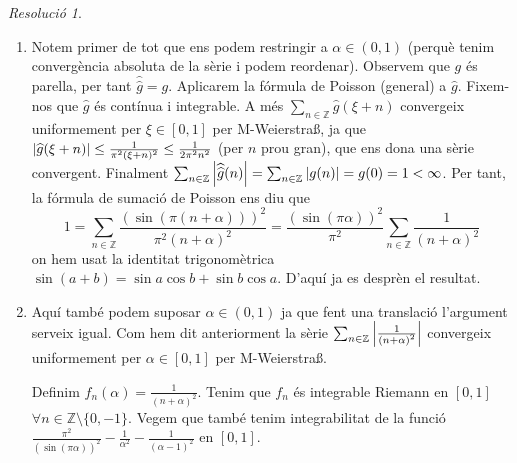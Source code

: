 \documentclass[10pt,a4paper]{article}
\newcommand{\ZZ}{\ensuremath{\mathbb{Z}}} %
\theoremstyle{definition}
\theoremstyle{remark}
\newtheorem*{res}{Resolució}
\begin{document}
\begin{res}\hfill
  \begin{enumerate}
    \item Notem primer de tot que ens podem restringir a $\alpha\in(0,1)$ (perquè tenim convergència absoluta de la sèrie i podem reordenar). Observem que $g$ és parella, per tant $\widehat{\widehat{g}}=g$. Aplicarem la fórmula de Poisson (general) a $\widehat{g}$. Fixem-nos que $\widehat{g}$ és contínua i integrable. A més $\sum_{n\in\ZZ}\widehat{g}(\xi+n)$ convergeix uniformement per $\xi\in[0,1]$ per M-Weierstra\ss, ja que $\abs{\widehat{g}(\xi+n)}\leq\frac{1}{\pi^2(\xi+n)^2}\leq \frac{1}{2\pi^2n^2}$ (per $n$ prou gran), que ens dona una sèrie convergent. Finalment $\sum_{n\in\ZZ}\abs{\widehat{\widehat{g}}(n)}=\sum_{n\in\ZZ}\abs{g(n)}=g(0)=1<\infty$. Per tant, la fórmula de sumació de Poisson ens diu que
          $$1=\sum_{n\in\ZZ}\frac{{(\sin(\pi{(n+\alpha)}))}^2}{\pi^2{(n+\alpha)}^2}=\frac{{(\sin(\pi\alpha))}^2}{\pi^2}\sum_{n\in\ZZ}\frac{1}{{(n+\alpha)}^2}$$
          on hem usat la identitat trigonomètrica $\sin(a+b)=\sin{a}\cos{b}+\sin{b}\cos{a}$. D'aquí ja es desprèn el resultat.
    \item Aquí també podem suposar $\alpha\in(0,1)$ ja que fent una translació l'argument serveix igual. Com hem dit anteriorment la sèrie $\sum_{n\in\ZZ}\abs{\frac{1}{{(n+\alpha)}^2}}$ convergeix uniformement per $\alpha\in[0,1]$ per M-Weierstra\ss.

          Definim $f_n(\alpha)=\frac{1}{{(n+\alpha)}^2}$. Tenim que $f_n$ és integrable Riemann en $[0,1]$ $\forall n\in\ZZ\setminus\{0,-1\}$. Vegem que també tenim integrabilitat de la funció $\frac{\pi^2}{{(\sin(\pi\alpha))}^2}-\frac{1}{\alpha^2}-\frac{1}{(\alpha-1)^2}$ en $[0,1]$.


\end{enumerate}
\end{res}
\end{document}
